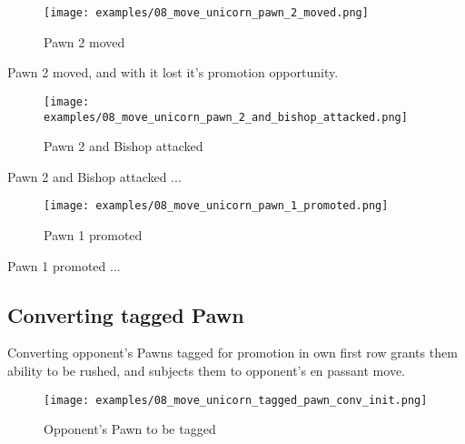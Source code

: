 \noindent
\begin{figure}[h]
\texttt{[image: examples/08\_move\_unicorn\_pawn\_2\_moved.png]}
\caption{Pawn 2 moved}
\label{fig:08_move_unicorn_pawn_2_moved}
\end{figure}

Pawn 2 moved, and with it lost it's promotion opportunity.

\clearpage %

\noindent
\begin{figure}[h]
\texttt{[image: examples/08\_move\_unicorn\_pawn\_2\_and\_bishop\_attacked.png]}
\caption{Pawn 2 and Bishop attacked}
\label{fig:08_move_unicorn_pawn_2_and_bishop_attacked}
\end{figure}

Pawn 2 and Bishop attacked ...

\clearpage %

\noindent
\begin{figure}[h]
\texttt{[image: examples/08\_move\_unicorn\_pawn\_1\_promoted.png]}
\caption{Pawn 1 promoted}
\label{fig:08_move_unicorn_pawn_1_promoted}
\end{figure}

Pawn 1 promoted ...

\clearpage %

\subsection*{Converting tagged Pawn}

Converting opponent's Pawns tagged for promotion in own first row grants them
ability to be rushed, and subjects them to opponent's en passant move.

\noindent
\begin{figure}[h]
\texttt{[image: examples/08\_move\_unicorn\_tagged\_pawn\_conv\_init.png]}
\caption{Opponent's Pawn to be tagged}
\label{fig:08_move_unicorn_tagged_pawn_conv_init}
\end{figure}

